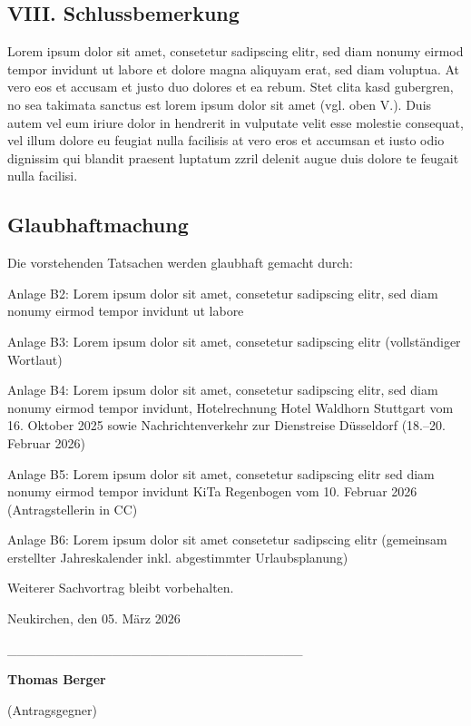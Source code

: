 \documentclass[
  11pt,
  a4paper,
]{article}
\begin{document}
\subsection{VIII. Schlussbemerkung}\label{viii.-schlussbemerkung}

Lorem ipsum dolor sit amet, consetetur sadipscing elitr, sed diam nonumy
eirmod tempor invidunt ut labore et dolore magna aliquyam erat, sed diam
voluptua. At vero eos et accusam et justo duo dolores et ea rebum. Stet
clita kasd gubergren, no sea takimata sanctus est lorem ipsum dolor sit
amet (vgl. oben V.). Duis autem vel eum iriure dolor in hendrerit in
vulputate velit esse molestie consequat, vel illum dolore eu feugiat
nulla facilisis at vero eros et accumsan et iusto odio dignissim qui
blandit praesent luptatum zzril delenit augue duis dolore te feugait
nulla facilisi.

\subsection{Glaubhaftmachung}\label{glaubhaftmachung}

Die vorstehenden Tatsachen werden glaubhaft gemacht durch:

Anlage B2: Lorem ipsum dolor sit amet, consetetur sadipscing elitr, sed
diam nonumy eirmod tempor invidunt ut labore

Anlage B3: Lorem ipsum dolor sit amet, consetetur sadipscing elitr
(vollständiger Wortlaut)

Anlage B4: Lorem ipsum dolor sit amet, consetetur sadipscing elitr, sed
diam nonumy eirmod tempor invidunt, Hotelrechnung Hotel Waldhorn
Stuttgart vom 16. Oktober 2025 sowie Nachrichtenverkehr zur Dienstreise
Düsseldorf (18.--20. Februar 2026)

Anlage B5: Lorem ipsum dolor sit amet, consetetur sadipscing elitr sed
diam nonumy eirmod tempor invidunt KiTa Regenbogen vom 10. Februar 2026
(Antragstellerin in CC)

Anlage B6: Lorem ipsum dolor sit amet consetetur sadipscing elitr
(gemeinsam erstellter Jahreskalender inkl. abgestimmter Urlaubsplanung)

\vspace{12pt}
\needspace{7cm}

Weiterer Sachvortrag bleibt vorbehalten.

\vspace{10pt}

Neukirchen, den 05. März 2026

\_\_\_\_\_\_\_\_\_\_\_\_\_\_\_\_\_\_\_\_\_\_\_\_\_\_\_\_\_\_\_

\textbf{Thomas Berger}

(Antragsgegner)
\end{document}
